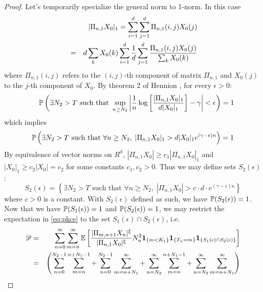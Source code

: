 \begin{proof}
  Let's temporarily specialize the general norm to
  1-norm. In this case
  \begin{eqnarray*}
    &&
    |\Pi_{n, 1} X_0|_1 = \sum_{i=1}^d \sum_{j=1}^d \Pi_{n, 1}(i, j)
    X_0(j) \\
    &=&
    d \sum_{k} X_0(k)
    \sum_{i=1}^d {1 \over d}
    \sum_{j=1}^d
    {
      \Pi_{n, 1}(i, j) X_0(j)
      \over
      \sum_{k} X_0(k)      
    }
  \end{eqnarray*}
  where $\Pi_{n, 1}(i, j)$ refers to the $(i, j)$-th component of
  matrix $\Pi_{n, 1}$ and $X_0(j)$ to the $j$-th component of $X_0$.
  By theorem 2 of Hennion \cite{hennion:1997}, for every
  $\epsilon > 0$:
  \begin{eqnarray*}
    &&
    \P \left(
    \exists N_2 > T \text{ such that }
      \sup_{n \geq N_2}
      \left|
        {1 \over n} \log \left[
          {|\Pi_{n, 1} X_0|_1 \over d |X_0|_1}
        \right]
        - \gamma
        \right|
        < \epsilon
    \right) = 1
  \end{eqnarray*}
  which implies
  \[
    \P \left(
    \exists N_2 > T \text{ such that }
      \forall n \geq N_2,\;
      |\Pi_{n, 1} X_0|_1 > d |X_0|_1 e^{(\gamma - \epsilon) n}
    \right) = 1
  \]
  By equivalence of vector norms on $R^d$,
  $|\Pi_{n, 1} X_0| \geq c_1 | \Pi_{n, 1} X_0|_1$ and
  $|X_0|_1 \geq c_2 |X_0| = c_2$
  for some constants $c_1, c_2 > 0$. Thus we may define sets
  $S_2(\epsilon)$:
  \[
  S_2(\epsilon) = \left\{
  \exists N_2 > T \text{ such that }
    \forall n \geq N_2,\;
    |\Pi_{n, 1} X_0| > c \cdot d \cdot e^{(\gamma - \epsilon) n}
  \right\}
  \]
  where $c > 0$ is a constant. With $S_2(\epsilon)$ defined as such,
  we have $\P(S_2(\epsilon)) = 1$. Now that we have
  $\P(S_1(\epsilon)) = 1$ and $\P(S_2(\epsilon)) = 1$, we may
  restrict the expectation in \eqref{eq:pkce} to the set
  $S_1(\epsilon) \cap S_2(\epsilon)$, i.e.
  \begin{eqnarray*}
    \mathscr D
    &=&
    \sum_{n = 0}^\infty \sum_{m = n}^\infty
    \E \left[
            {
        |\Pi_{m, n+1} X_n |^{\xi}
        \over
        |\Pi_{n, 1} X_0 |^{\xi}        
      }
      N_u^2
      \1{m < K_1} \1{T_u = m} \1{S_1(\epsilon) \cap S_2(\epsilon)} 
      \right] \\
    &=&
    \left(
    \sum_{n = 0}^{N_2 - 1} \sum_{m = n}^{n + N_1 - 1}
    +
    \sum_{n = 0}^{N_2 - 1} \sum_{m = n + N_1}^\infty
    +
    \sum_{n = N_2}^{\infty} \sum_{m = n}^{n + N_1 - 1}
    +
    \sum_{n = N_2}^{\infty} \sum_{m = n + N_1}^\infty
    \right) \nonumber \\

\end{eqnarray*}
\end{proof}
